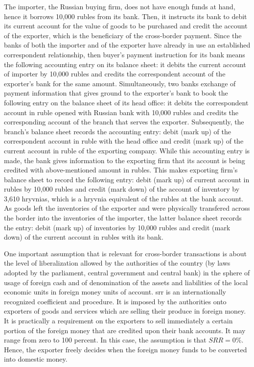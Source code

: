The importer, the Russian buying firm, does not have enough funds at hand, hence it borrows 10,000 rubles from its bank. Then, it instructs its bank to debit its current account for the value of goods to be purchased and credit the account of the exporter, which is the beneficiary of the cross-border payment. Since the banks of both the importer and of the exporter have already in use an established correspondent relationship, then buyer's payment instruction for its bank means the following accounting entry on its balance sheet: it debits the current account of importer by 10,000 rubles and credits the correspondent account of the exporter's bank for the same amount. Simultaneously, two banks exchange of payment information that gives ground to the exporter's bank to book the following entry on the balance sheet of its head office: it debits the correspondent account in ruble opened with Russian bank with 10,000 rubles and credits the corresponding account of the branch that serves the exporter. Subsequently, the branch's balance sheet records the accounting entry: debit (mark up) of the correspondent account in ruble with the head office and credit (mark up) of the current account in ruble of the exporting company. While this accounting entry is made, the bank gives information to the exporting firm that its account is being credited with above-mentioned amount in rubles. This makes exporting firm's balance sheet to record the following entry: debit (mark up) of current account in rubles by 10,000 rubles and credit (mark down) of the account of inventory by 3,610 hryvnias, which is a hryvnia equivalent of the rubles at the bank account. As goods left the inventories of the exporter and were physically transfered across the border into the inventories of the importer, the latter balance sheet records the entry: debit (mark up) of inventories by 10,000 rubles and credit (mark down) of the current account in rubles with its bank. \par

One important assumption that is relevant for cross-border transactions is about the level of liberalization allowed by the authorities of the country (by laws adopted by the parliament, central government and central bank) in the sphere of usage of foreign cash and of denomination of the assets and liabilities of the local economic units in foreign money units of account. \acf{srr} is an internationally recognized coefficient and procedure. It is imposed by the authorities onto exporters of goods and services which are selling their produce in foreign money. It is practically a requirement on the exporters to sell immediately a certain portion of the foreign money that are credited upon their bank accounts. It may range from zero to 100 percent. In this case, the assumption is that $SRR=0\%$. Hence, the exporter freely decides when the foreign money funds to be converted into domestic money. \par

